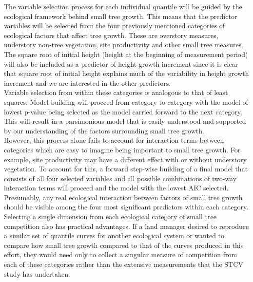 \documentclass[10pt, letterpaper, fleqn]{article}
\begin{document}
\noindent 
The variable selection process for each individual quantile will be guided by the ecological framework behind small tree growth.  This means that the predictor variables will be selected from the four previously mentioned categories of ecological factors that affect tree growth. These are overstory measures, understory non-tree vegetation, site productivity and other small tree measures.  The square root of initial height (height at the beginning of measurement period) will also be included as a predictor of height growth increment since it is clear that square root of initial height explains much of the variability in height growth increment and we are interested in the other predictors.\\[2pt]
\noindent 
Variable selection from within these categories is analogous to that of least squares.   Model building will proceed from category to category with the model of lowest p-value being selected as the model carried forward to the next category. This will result in a parsimonious model that is easily understood and supported by our understanding of the factors surrounding small tree growth. \\[2pt]
\noindent 
However, this process alone fails to account for interaction terms between categories which are easy to imagine being important to small tree growth. For example, site productivity may have a different effect with or without understory vegetation.  To account for this, a forward step-wise building of a final model that consists of all four selected variables and all possible combinations of two-way interaction terms will proceed and the model with the lowest AIC selected. Presumably, any real ecological interaction between factors of small tree growth should be visible among the four most significant predictors within each category.\\[2pt]
\noindent 
Selecting a single dimension from each ecological category of small tree competition also has practical advantages.  If a land manager desired to reproduce a similar set of quantile curves for another ecological system or wanted to compare how small tree growth compared to that of the curves produced in this effort, they would need only to collect a singular measure of competition from each of these categories rather than the extensive measurements that the STCV study has undertaken.\\[2pt]

\printbibliography
\end{document}
